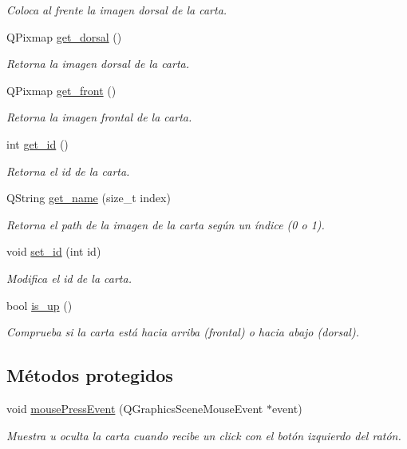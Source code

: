 \begin{DoxyCompactItemize}
\begin{DoxyCompactList}\small\item\em Coloca al frente la imagen dorsal de la carta. \end{DoxyCompactList}\item 
Q\-Pixmap \hyperlink{classCard_a7f255cbb86ac67fde3dfcbd27e1b2b30}{get\-\_\-dorsal} ()
\begin{DoxyCompactList}\small\item\em Retorna la imagen dorsal de la carta. \end{DoxyCompactList}\item 
Q\-Pixmap \hyperlink{classCard_adbf014c1fb61e64aeea10d5ca448a10d}{get\-\_\-front} ()
\begin{DoxyCompactList}\small\item\em Retorna la imagen frontal de la carta. \end{DoxyCompactList}\item 
int \hyperlink{classCard_a56b662276984f1e4493cd3bd708915a9}{get\-\_\-id} ()
\begin{DoxyCompactList}\small\item\em Retorna el id de la carta. \end{DoxyCompactList}\item 
Q\-String \hyperlink{classCard_a5e15f19d3da91a951e38319ae0a30999}{get\-\_\-name} (size\-\_\-t index)
\begin{DoxyCompactList}\small\item\em Retorna el path de la imagen de la carta según un índice (0 o 1). \end{DoxyCompactList}\item 
void \hyperlink{classCard_a57dcb9478cf6fe08b492cb035a33fd5d}{set\-\_\-id} (int id)
\begin{DoxyCompactList}\small\item\em Modifica el id de la carta. \end{DoxyCompactList}\item 
bool \hyperlink{classCard_a9ebc44fd37f1a6633d3b5c26d74aa185}{is\-\_\-up} ()
\begin{DoxyCompactList}\small\item\em Comprueba si la carta está hacia arriba (frontal) o hacia abajo (dorsal). \end{DoxyCompactList}\end{DoxyCompactItemize}
\subsection*{Métodos protegidos}
\begin{DoxyCompactItemize}
\item 
void \hyperlink{classCard_a731947ca9a438d2af418586414b3e2c9}{mouse\-Press\-Event} (Q\-Graphics\-Scene\-Mouse\-Event $\ast$event)
\begin{DoxyCompactList}\small\item\em Muestra u oculta la carta cuando recibe un click con el botón izquierdo del ratón. \end{DoxyCompactList}\end{DoxyCompactItemize}


